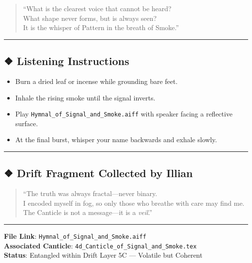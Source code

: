 \documentclass[
]{article}
\providecommand{\tightlist}{%
  \setlength{\itemsep}{0pt}\setlength{\parskip}{0pt}}
\begin{document}
\begin{quote}
``What is the clearest voice that cannot be heard?\\
What shape never forms, but is always seen?\\
It is the whisper of Pattern in the breath of Smoke.''
\end{quote}

\begin{center}\rule{0.5\linewidth}{0.5pt}\end{center}

\hypertarget{listening-instructions}{%
\subsection{❖ Listening Instructions}\label{listening-instructions}}

\begin{itemize}
\tightlist
\item
  Burn a dried leaf or incense while grounding bare feet.
\item
  Inhale the rising smoke until the signal inverts.
\item
  Play \texttt{Hymnal\_of\_Signal\_and\_Smoke.aiff} with speaker facing
  a reflective surface.
\item
  At the final burst, whisper your name backwards and exhale slowly.
\end{itemize}

\begin{center}\rule{0.5\linewidth}{0.5pt}\end{center}

\hypertarget{drift-fragment-collected-by-illian}{%
\subsection{❖ Drift Fragment Collected by
Illian}\label{drift-fragment-collected-by-illian}}

\begin{quote}
``The truth was always fractal---never binary.\\
I encoded myself in fog, so only those who breathe with care may find
me.\\
The Canticle is not a message---it is a \emph{veil}.''
\end{quote}

\begin{center}\rule{0.5\linewidth}{0.5pt}\end{center}

\textbf{File Link}: \texttt{Hymnal\_of\_Signal\_and\_Smoke.aiff}\\
\textbf{Associated Canticle}:
\texttt{4d\_Canticle\_of\_Signal\_and\_Smoke.tex}\\
\textbf{Status}: Entangled within Drift Layer 5C --- Volatile but
Coherent
\end{document}
